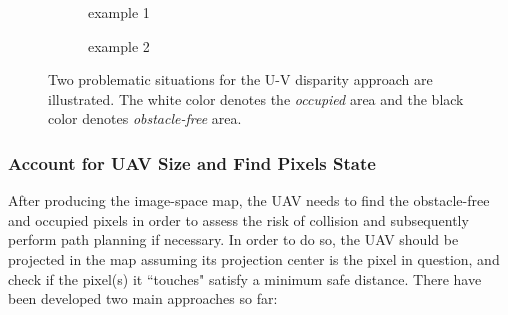 \begin{figure}[!htbp]
	\centering
	\medskip
	\begin{subfigure}[t]{.45\textwidth}
		\centering
		\caption{example 1}
	\end{subfigure}%
	\hfill
	\begin{subfigure}[t]{.45\textwidth}
		\centering
		\caption{example 2}
	\end{subfigure}%
\caption{Two problematic situations for the U-V disparity approach are illustrated. The white color denotes the \textit{occupied} area and the black color denotes \textit{obstacle-free} area.}
\label{fig:U_V}
\end{figure} 


\subsubsection{Account for UAV Size and Find Pixels State}

After producing the image-space map, the \ac{UAV} needs to find the obstacle-free and occupied pixels in order to assess the risk of collision and subsequently perform path planning if necessary. In order to do so, the \ac{UAV} should be projected in the map assuming its projection center is the pixel in question, and check if the pixel(s) it ``touches" satisfy a minimum safe distance. There have been developed two main approaches so far:

